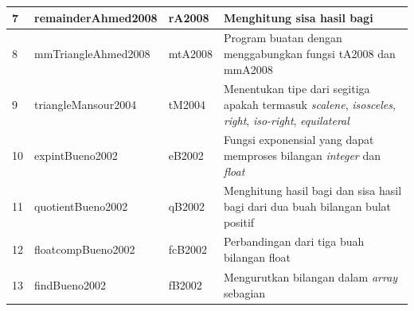 \begin{table}[h!]
\begin{center}
\begin{tabular}{|l|l|l|p{9cm}|}
 				7                                                         & remainderAhmed2008                                                & rA2008                                                     & Menghitung sisa hasil bagi                                                                                            \\ \hline
 				8                                                         & mmTriangleAhmed2008                                               & mtA2008                                                    & Program buatan dengan menggabungkan fungsi tA2008 dan mmA2008                                                         \\ \hline
 				9                                                         & triangleMansour2004                                               & tM2004                                                     & Menentukan tipe dari segitiga apakah termasuk \textit{scalene}, \textit{isosceles}, \textit{right}, \textit{iso-right}, \textit{equilateral}                       \\ \hline
 				10                                                        & expintBueno2002                                                   & eB2002                                                     & Fungsi exponensial yang dapat memproses bilangan \textit{integer} dan \textit{float}                                                    \\ \hline
 				11                                                        & quotientBueno2002                                                 & qB2002                                                     & Menghitung hasil bagi dan sisa hasil bagi dari dua buah bilangan bulat positif                                        \\ \hline
 				12                                                        & floatcompBueno2002                                                & fcB2002                                                    & Perbandingan dari tiga buah bilangan float                                                                            \\ \hline
 				13                                                        & findBueno2002                                                     & fB2002                                                     & Mengurutkan bilangan dalam \textit{array} sebagian                                                                             \\ \hline

\end{tabular}
\end{center}
\end{table}
